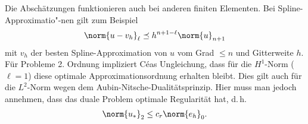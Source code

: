 Die Abschätzungen funktionieren auch bei anderen finiten Elementen.
Bei Spline-Approximatio"-nen gilt zum Beispiel
\begin{align*}
    \norm{u - v_h}_\ell \preceq h^{n+1-\ell} \norm{u}_{n+1}
\end{align*}
mit $v_h$ der besten Spline-Approximation von $u$ vom Grad $\le n$ und Gitterweite $h$.
Für Probleme 2. Ordnung impliziert Céas Ungleichung, dass für
die $H^1$-Norm ($\ell = 1$) diese optimale Approximationsordnung erhalten bleibt.
Dies gilt auch für die $L^2$-Norm wegen dem Aubin-Nitsche-Dualitätsprinzip.
Hier muss man jedoch annehmen, dass das duale Problem optimale Regularität hat, d.\,h.
\begin{align*}
    \norm{u_\ast}_2 \le c_r \norm{e_h}_0.
\end{align*}

\pagebreak
